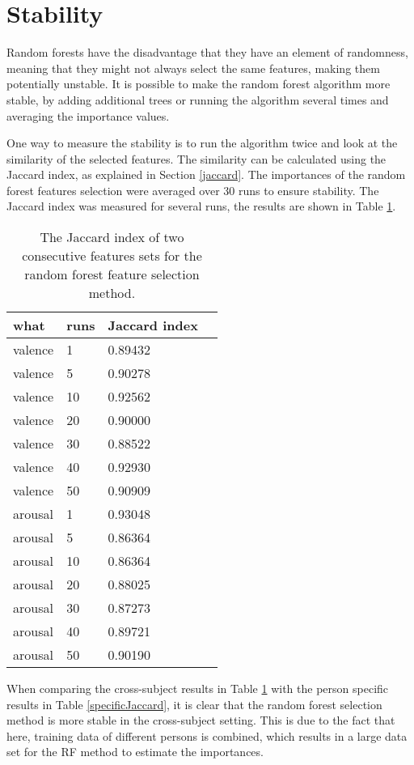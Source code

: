 \section{Stability}
Random forests have the disadvantage that they have an element of randomness, meaning that they might not always select the same features, making them potentially unstable. It is possible to make the random forest algorithm more stable, by adding additional trees or running the algorithm several times and averaging the importance values. 

\npar

One way to measure the stability is to run the algorithm twice and look at the similarity of the selected features. The similarity can be calculated using the Jaccard index, as explained in Section \ref{jaccard}. The importances of the random forest features selection were averaged over 30 runs to ensure stability. The Jaccard index was measured for several runs, the results are shown in Table \ref{Jaccard_gen}.

\begin{table}[H]
\centering
\caption{The Jaccard index of two consecutive features sets for the random forest feature selection method. \label{Jaccard_gen}}
\begin{tabular}{l|l|ll}
\textbf{what} & \textbf{runs} & \textbf{Jaccard index}    \\ \hline
valence       & 1             & 0.89432                   \\
valence       & 5             & 0.90278                   \\
valence       & 10            & 0.92562                   \\
valence       & 20            & 0.90000                   \\
valence       & 30            & 0.88522                   \\
valence       & 40            & 0.92930                   \\
valence       & 50            & 0.90909                   \\ \hline
arousal       & 1             & 0.93048                   \\
arousal       & 5             & 0.86364                   \\
arousal       & 10            & 0.86364                   \\
arousal       & 20            & 0.88025                   \\
arousal       & 30            & 0.87273                   \\
arousal       & 40            & 0.89721                   \\
arousal       & 50            & 0.90190                  
\end{tabular}
\end{table}

When comparing the cross-subject results in Table \ref{Jaccard_gen} with the person specific results in Table \ref{specificJaccard}, it is clear that the random forest selection method is more stable in the cross-subject setting. This is due to the fact that here, training data of different persons is combined, which results in a large data set for the RF method to estimate the importances.